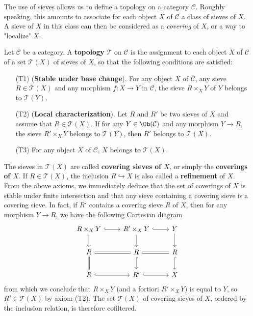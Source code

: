 The use of sieves allows us to define a topology on a category $\mathcal{C}$. Roughly speaking, this amounts to associate for each object $X$ of $\mathcal{C}$ a class of sieves of $X$. A sieve of $X$ in this class can then be considered as a \textit{covering} of $X$, or a way to "localize" $X$.
\begin{definition}
Let $\mathcal{C}$ be a category. A \textbf{topology} $\mathcal{T}$ on $\mathcal{C}$ is the assignment to each object $X$ of $\mathcal{C}$ of a set $\mathcal{T}(X)$ of sieves of $X$, so that the following conditions are satisfied:
\begin{enumerate}[leftmargin=40pt]
\item[(T1)] (\textbf{Stable under base change}). For any object $X$ of $\mathcal{C}$, any sieve $R\in\mathcal{T}(X)$ and any morphism $f:X\to Y$ in $\mathcal{C}$, the sieve $R\times_XY$ of $Y$ belongs to $\mathcal{T}(Y)$.
\item[(T2)] (\textbf{Local characterization}). Let $R$ and $R'$ be two sieves of $X$ and assume that $R\in\mathcal{T}(X)$. If for any $Y\in\Ob(\mathcal{C})$ and any morphism $Y\to R$, the sieve $R'\times_XY$ belongs to $\mathcal{T}(Y)$, then $R'$ belongs to $\mathcal{T}(X)$.
\item[(T3)] For any object $X$ of $\mathcal{C}$, $X$ belongs to $\mathcal{T}(X)$.
\end{enumerate}
\end{definition}
The sieves in $\mathcal{T}(X)$ are called \textbf{covering sieves of $X$}, or simply the \textbf{coverings of $X$}. If $R\in\mathcal{T}(X)$, the inclusion $R\hookrightarrow X$ is also called a \textbf{refinement} of $X$. From the above axioms, we immediately deduce that the set of coverings of $X$ is stable under finite intersection and that any sieve containing a covering sieve is a covering sieve. In fact, if $R'$ contains a covering sieve $R$ of $X$, then for any morphism $Y\to R$, we have the following Cartesian diagram
\[\begin{tikzcd}
R\times_XY\ar[r,hook]\ar[d]&R'\times_XY\ar[d]\ar[r,hook]&Y\ar[d]\\
R\ar[d,equal]\ar[r,equal]&R\ar[r,equal]\ar[d,hook]&R\ar[d,hook]\\
R\ar[r,hook]&R'\ar[r,hook]&X
\end{tikzcd}\]
from which we conclude that $R\times_XY$ (and a fortiori $R'\times_XY$) is equal to $Y$, so $R'\in\mathcal{T}(X)$ by axiom (T2). The set $\mathcal{T}(X)$ of covering sieves of $X$, ordered by the inclusion relation, is therefore cofiltered.\par
